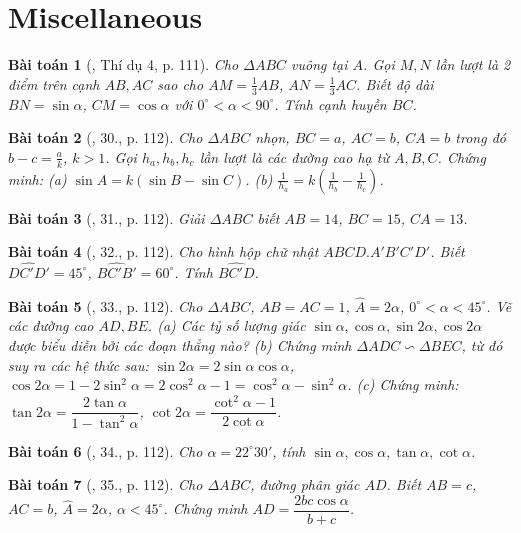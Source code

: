 \documentclass{article}
\newtheorem{baitoan}{Bài toán}
\begin{document}

\section{Miscellaneous}

\begin{baitoan}[\cite{Tuyen_Toan_9}, Thí dụ 4, p. 111]
	Cho $\Delta ABC$ vuông tại $A$. Gọi $M,N$ lần lượt là 2 điểm trên cạnh $AB,AC$ sao cho $AM = \frac{1}{3}AB$, $AN = \frac{1}{3}AC$. Biết độ dài $BN = \sin\alpha$, $CM = \cos\alpha$ với $0^\circ < \alpha < 90^\circ$. Tính cạnh huyền $BC$.
\end{baitoan}

\begin{baitoan}[\cite{Tuyen_Toan_9}, 30., p. 112]
	Cho $\Delta ABC$ nhọn, $BC = a$, $AC = b$, $CA = b$ trong đó $b - c = \frac{a}{k}$, $k > 1$. Gọi $h_a,h_b,h_c$ lần lượt là các đường cao hạ từ $A,B,C$. Chứng minh: (a) $\sin A = k(\sin B - \sin C)$. (b) $\frac{1}{h_a} = k\left(\frac{1}{h_b} - \frac{1}{h_c}\right)$.
\end{baitoan}

\begin{baitoan}[\cite{Tuyen_Toan_9}, 31., p. 112]
	Giải $\Delta ABC$ biết $AB = 14$, $BC = 15$, $CA = 13$.
\end{baitoan}

\begin{baitoan}[\cite{Tuyen_Toan_9}, 32., p. 112]
	Cho hình hộp chữ nhật $ABCD.A'B'C'D'$. Biết $\widehat{DC'D'} = 45^\circ$, $\widehat{BC'B'} = 60^\circ$. Tính $\widehat{BC'D}$.
\end{baitoan}

\begin{baitoan}[\cite{Tuyen_Toan_9}, 33., p. 112]
	Cho $\Delta ABC$, $AB = AC = 1$, $\widehat{A} = 2\alpha$, $0^\circ < \alpha < 45^\circ$. Vẽ các đường cao $AD,BE$. (a) Các tỷ số lượng giác $\sin\alpha,\cos\alpha,\sin2\alpha,\cos2\alpha$ được biểu diễn bởi các đoạn thẳng nào? (b) Chứng minh $\Delta ADC\backsim\Delta BEC$, từ đó suy ra các hệ thức sau: $\sin2\alpha = 2\sin\alpha\cos\alpha$, $\cos2\alpha = 1 - 2\sin^2\alpha = 2\cos^2\alpha - 1 = \cos^2\alpha - \sin^2\alpha$. (c) Chứng minh: $\tan2\alpha = \dfrac{2\tan\alpha}{1 - \tan^2\alpha}$, $\cot2\alpha = \dfrac{\cot^2\alpha - 1}{2\cot\alpha}$.
\end{baitoan}

\begin{baitoan}[\cite{Tuyen_Toan_9}, 34., p. 112]
	Cho $\alpha = 22^\circ30'$, tính $\sin\alpha,\cos\alpha,\tan\alpha,\cot\alpha$.
\end{baitoan}

\begin{baitoan}[\cite{Tuyen_Toan_9}, 35., p. 112]
	Cho $\Delta ABC$, đường phân giác $AD$. Biết $AB = c$, $AC = b$, $\widehat{A} = 2\alpha$, $\alpha < 45^\circ$. Chứng minh $AD = \dfrac{2bc\cos\alpha}{b + c}$.
\end{baitoan}


\printbibliography[heading=bibintoc]
	
	
\end{document}
